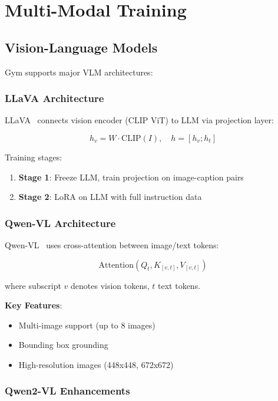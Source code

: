 \documentclass[11pt,letterpaper]{article}
\begin{document}
\section{Multi-Modal Training}

\subsection{Vision-Language Models}

Gym supports major VLM architectures:

\subsubsection{LLaVA Architecture}

LLaVA~\citep{liu2023llava} connects vision encoder (CLIP ViT) to LLM via projection layer:

\begin{equation}
h_v = W \cdot \text{CLIP}(I), \quad h = [h_v; h_t]
\end{equation}

Training stages:
\begin{enumerate}
\item \textbf{Stage 1}: Freeze LLM, train projection on image-caption pairs
\item \textbf{Stage 2}: LoRA on LLM with full instruction data
\end{enumerate}

\subsubsection{Qwen-VL Architecture}

Qwen-VL~\citep{bai2023qwenvl} uses cross-attention between image/text tokens:

\begin{equation}
\text{Attention}(Q_t, K_{[v,t]}, V_{[v,t]})
\end{equation}

where subscript $v$ denotes vision tokens, $t$ text tokens.

\textbf{Key Features}:
\begin{itemize}
\item Multi-image support (up to 8 images)
\item Bounding box grounding
\item High-resolution images (448x448, 672x672)
\end{itemize}

\subsubsection{Qwen2-VL Enhancements}
\end{document}
